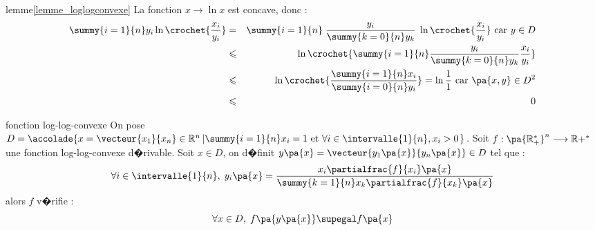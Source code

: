 \begin{xdemo}{lemme}{\ref{lemme_loglogconvexe}}
La fonction $x \longrightarrow \ln x$ est concave, donc :
        \begin{eqnarray*}
        \summy{i=1}{n} y_i \ln \crochet{\dfrac{x_i}{y_i}} &=&  \summy{i=1}{n} \;  \dfrac{y_i}{\summy{k=0}{n}y_k} \; 
                    \ln \crochet{\dfrac{x_i}{y_i}} \text{ car } y \in D\\
        &\leqslant&  \ln \crochet { \summy{i=1}{n} \dfrac{y_i}{\summy{k=0}{n}y_k}  \dfrac{x_i}{y_i} } \\
        &\leqslant&  \ln \crochet {  \dfrac{\summy{i=1}{n}x_i}{\summy{i=0}{n}y_i}  }  = 
        \ln \dfrac{1}{1} \text{ car } \pa{x,y} \in D^2 \\
        &\leqslant& 0
        \end{eqnarray*}
\end{xdemo}











            \begin{xtheorem}{fonction log-log-convexe}
            \label{theorem_loglogconvexe}%
            On pose $D = \accolade{x=\vecteur{x_1}{x_n} \in \mathbb{R}^n \left| \summy{i=1}{n} x_i = 1 \text{ et } \forall i 
            \in \intervalle{1}{n}, x_i > 0 \right.} $.\newline%
            Soit $f : \pa{\mathbb{R}^*_+}^n \longrightarrow \mathbb{R}+^*$ une fonction log-log-convexe d�rivable.\newline%
            Soit $x \in D$, on d�finit $y \pa{x} = \vecteur{y_1\pa{x}}{y_n\pa{x}} \in D$ tel que :
                    $$
                    \forall i \in \intervalle{1}{n}, \; y_i \pa{x} = \frac{x_i \partialfrac{f}{x_i}\pa{x}}
                                {\summy{k=1}{n}x_k \partialfrac{f}{x_k}\pa{x}}
                    $$
            alors $f$ v�rifie :
                    $$
                    \forall x \in D, \; f\pa{ y \pa{x}} \supegal f\pa{x}
                    $$
            \end{xtheorem}
            
            
            
